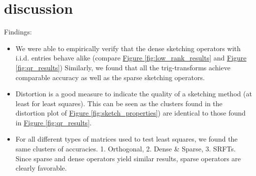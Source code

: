 \documentclass{article}
\begin{document}
\section{discussion}
Findings:
\begin{itemize}
    \item We were able to empirically verify that the dense sketching operators with i.i.d. entries behave alike (compare \hyperref[fig:low_rank_results]{Figure \ref*{fig:low_rank_results}} and \hyperref[fig:qr_results]{Figure \ref*{fig:qr_results}})
    Similarly, we found that all the trig-transforms achieve comparable accuracy as well as the sparse sketching operators.
    \item  Distortion is a good measure to indicate the quality of a sketching method (at least for least squares). This can be seen as the clusters found in the distortion plot of \hyperref[fig:sketch_properties]{Figure \ref*{fig:sketch_properties}}) are identical to those found in \hyperref[fig:qr_results]{Figure \ref*{fig:qr_results}}.
    \item For all different types of matrices used to test least squares, we found the same clusters of accuracies. 1. Orthogonal, 2. Dense \& Sparse, 3. SRFTs. Since sparse and dense operators yield similar results, sparse operators are clearly favorable.
    
\end{itemize}
\printbibliography
\end{document}

